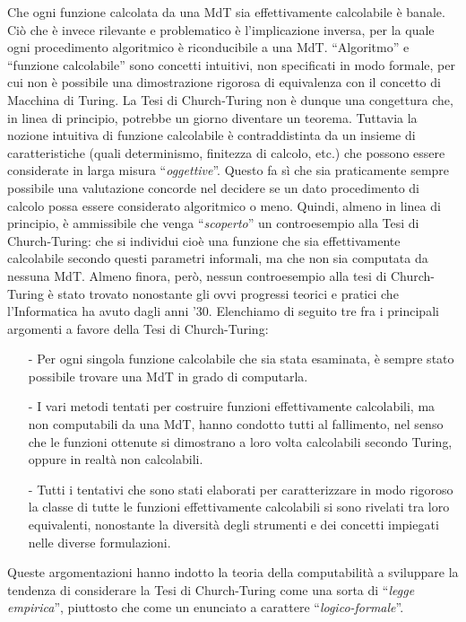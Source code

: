 \documentclass[12pt,a4paper]{report}
\theoremstyle{definition}
\begin{document}
Che ogni funzione calcolata da una MdT sia effettivamente calcolabile è banale. Ciò che è invece rilevante e problematico è l'implicazione inversa, per la quale ogni procedimento algoritmico è riconducibile a una MdT. ``Algoritmo'' e ``funzione calcolabile'' sono concetti intuitivi, non specificati in modo formale, per cui non è possibile una dimostrazione rigorosa di equivalenza con il concetto di Macchina di Turing. La Tesi di Church-Turing non è dunque una congettura che, in linea di principio, potrebbe un giorno diventare un teorema. Tuttavia la nozione intuitiva di funzione calcolabile è contraddistinta da un insieme di caratteristiche (quali determinismo, finitezza di calcolo, etc.) che possono essere considerate in larga misura ``\emph{oggettive}''. Questo fa sì che sia praticamente sempre possibile una valutazione concorde nel decidere se un dato procedimento di calcolo possa essere considerato algoritmico o meno. Quindi, almeno in linea di principio, è ammissibile che venga ``\emph{scoperto}'' un controesempio alla Tesi di Church-Turing: che si individui cioè una funzione che sia effettivamente calcolabile secondo questi parametri informali, ma che non sia computata da nessuna MdT. Almeno finora, però, nessun controesempio alla tesi di Church-Turing è stato trovato nonostante gli ovvi progressi teorici e pratici che l'Informatica ha avuto dagli anni '30. Elenchiamo di seguito tre fra i principali argomenti a favore della Tesi di Church-Turing:
\begin{itemize}
\item[-] Per ogni singola funzione calcolabile che sia stata esaminata, è sempre stato possibile trovare una MdT in grado di computarla.
\item[-] I vari metodi tentati per costruire funzioni effettivamente calcolabili, ma non computabili da una MdT, hanno condotto tutti al fallimento, nel senso che le funzioni ottenute si dimostrano a loro volta calcolabili secondo Turing, oppure in realtà non calcolabili.
\item[-] Tutti i tentativi che sono stati elaborati per caratterizzare in modo rigoroso la classe di tutte le funzioni effettivamente calcolabili si sono rivelati tra loro equivalenti, nonostante la diversità degli strumenti e dei concetti impiegati nelle diverse formulazioni.
\end{itemize}
Queste argomentazioni hanno indotto la teoria della computabilità a sviluppare la tendenza di considerare la Tesi di Church-Turing come una sorta di ``\emph{legge empirica}'', piuttosto che come un enunciato a carattere ``\emph{logico-formale}''.\\
\end{document}
